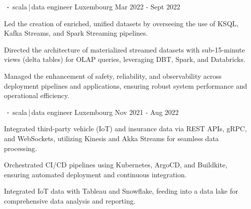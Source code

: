 \begin{cventries}
    \cventry
    {     }
    {$\sqbig$scala\,|\,data engineer}
    {Luxembourg}
    {Mar 2022 - Sept 2022}
    {}
    {
        \begin{cvitems}
            \item{Led the creation of enriched, unified datasets by overseeing the use of KSQL, Kafka Streams, and Spark Streaming pipelines.}
            \item{Directed the architecture of materialized streamed datasets with sub-15-minute views (delta tables) for OLAP queries, leveraging DBT, Spark, and Databricks.}
            \item{Managed the enhancement of safety, reliability, and observability across deployment pipelines and applications, ensuring robust system performance and operational efficiency.}
        \end{cvitems}
    }


    \cventry
    {       }
    {$\sqbig$scala\,|\,data engineer}
    {Luxembourg}
    {Nov 2021 - Aug 2022}
    {}
    {
        \begin{cvitems}
            \item{Integrated third-party vehicle (IoT) and insurance data via REST APIs, gRPC, and WebSockets, utilizing Kinesis and Akka Streams for seamless data processing.}
            \item{Orchestrated CI/CD pipelines using Kubernetes, ArgoCD, and Buildkite, ensuring automated deployment and continuous integration.}
            \item{Integrated IoT data with Tableau and Snowflake, feeding into a data lake for comprehensive data analysis and reporting.}
        \end{cvitems}
    }


\end{cventries}
